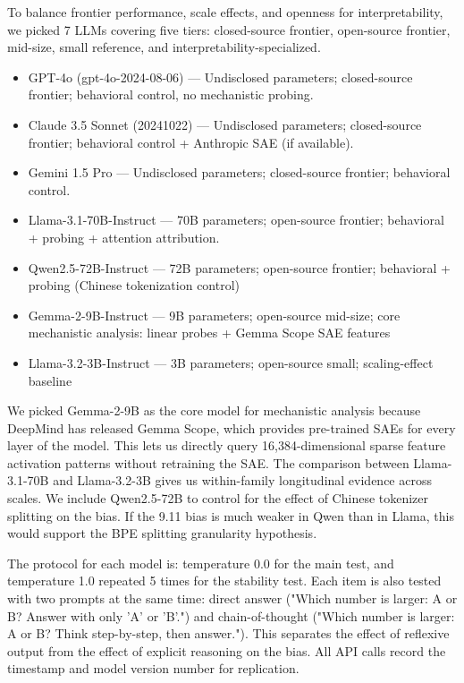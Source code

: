 To balance frontier performance, scale effects, and openness for interpretability, we picked 7 LLMs covering five tiers: closed-source frontier, open-source frontier, mid-size, small reference, and interpretability-specialized.

\begin{itemize}
    \item GPT-4o (gpt-4o-2024-08-06) — Undisclosed parameters; closed-source frontier; behavioral control, no mechanistic probing.
    \item Claude 3.5 Sonnet (20241022) — Undisclosed parameters; closed-source frontier; behavioral control + Anthropic SAE (if available).
    \item Gemini 1.5 Pro — Undisclosed parameters; closed-source frontier; behavioral control.
    \item Llama-3.1-70B-Instruct — 70B parameters; open-source frontier; behavioral + probing + attention attribution.
    \item Qwen2.5-72B-Instruct — 72B parameters; open-source frontier; behavioral + probing (Chinese tokenization control)
    \item Gemma-2-9B-Instruct — 9B parameters; open-source mid-size; core mechanistic analysis: linear probes + Gemma Scope SAE features
    \item Llama-3.2-3B-Instruct — 3B parameters; open-source small; scaling-effect baseline
\end{itemize}

We picked Gemma-2-9B as the core model for mechanistic analysis because DeepMind has released Gemma Scope\cite{lieberum2024}, which provides pre-trained SAEs for every layer of the model. This lets us directly query 16,384-dimensional sparse feature activation patterns without retraining the SAE. The comparison between Llama-3.1-70B and Llama-3.2-3B gives us within-family longitudinal evidence across scales. We include Qwen2.5-72B to control for the effect of Chinese tokenizer splitting on the bias. If the 9.11 bias is much weaker in Qwen than in Llama, this would support the BPE splitting granularity hypothesis.

The protocol for each model is: temperature 0.0 for the main test, and temperature 1.0 repeated 5 times for the stability test. Each item is also tested with two prompts at the same time: direct answer ("Which number is larger: A or B? Answer with only 'A' or 'B'.") and chain-of-thought ("Which number is larger: A or B? Think step-by-step, then answer."). This separates the effect of reflexive output from the effect of explicit reasoning on the bias. All API calls record the timestamp and model version number for replication.

